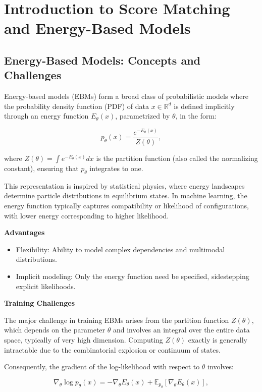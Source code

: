 \chapter{Introduction to Score Matching and Energy-Based Models}

\section{Energy-Based Models: Concepts and Challenges}

Energy-based models (EBMs) form a broad class of probabilistic models where the probability density function (PDF) of data \( x \in \mathbb{R}^d \) is defined implicitly through an energy function \( E_\theta(x) \), parametrized by \( \theta \), in the form:

\[
p_\theta(x) = \frac{e^{-E_\theta(x)}}{Z(\theta)},
\]

where \( Z(\theta) = \int e^{-E_\theta(x)} dx \) is the partition function (also called the normalizing constant), ensuring that \( p_\theta \) integrates to one.

This representation is inspired by statistical physics, where energy landscapes determine particle distributions in equilibrium states. In machine learning, the energy function typically captures compatibility or likelihood of configurations, with lower energy corresponding to higher likelihood.

\textbf{Advantages}

\begin{itemize}
    \item Flexibility: Ability to model complex dependencies and multimodal distributions.
    \item Implicit modeling: Only the energy function need be specified, sidestepping explicit likelihoods.
\end{itemize}

\textbf{Training Challenges}

The major challenge in training EBMs arises from the partition function \( Z(\theta) \), which depends on the parameter \( \theta \) and involves an integral over the entire data space, typically of very high dimension. Computing \( Z(\theta) \) exactly is generally intractable due to the combinatorial explosion or continuum of states.

Consequently, the gradient of the log-likelihood with respect to \( \theta \) involves:

\[
\nabla_\theta \log p_\theta(x) = - \nabla_\theta E_\theta(x) + \mathbb{E}_{p_\theta}[\nabla_\theta E_\theta(x)],
\]

